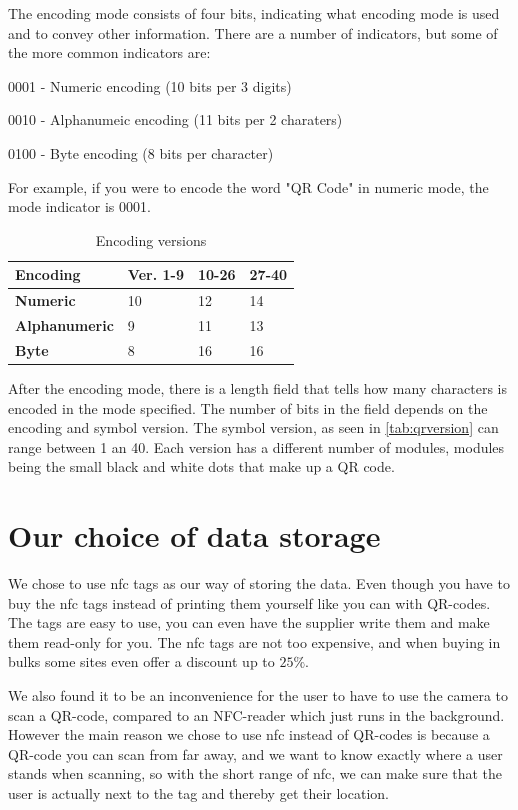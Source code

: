 The encoding mode consists of four bits, indicating what encoding mode is used and to convey other information. There are a number of indicators, but some of the more common indicators are:

\begin{description}
\item 0001 - Numeric encoding (10 bits per 3 digits)
\item 0010 - Alphanumeic encoding (11 bits per 2 charaters)
\item 0100 - Byte encoding (8 bits per character)
\end{description}

For example, if you were to encode the word "QR Code" in numeric mode, the mode indicator is 0001.

\begin{table}[H]
\centering
\begin{tabular}{|l|l|l|l|}
\hline
\textbf{Encoding} & \textbf{Ver. 1-9} & \textbf{10-26} & \textbf{27-40} \\
\hline
\textbf{Numeric } & 10 & 12 & 14  \\
\hline
\textbf{Alphanumeric} & 9 & 11 & 13 \\
\hline
\textbf{Byte} & 8 & 16 & 16 \\
\hline
\end{tabular}
\caption{Encoding versions}
\label{tab:qrversion}
\end{table}

After the encoding mode, there is a length field that tells how many characters is encoded in the mode specified. The number of bits in the field depends on the encoding and symbol version\citep{qrcode1}. The symbol version, as seen in \autoref{tab:qrversion} can range between 1 an 40. Each version has a different number of modules, modules being the small black and white dots that make up a QR code\citep{qrversion}. 

\section*{Our choice of data storage}
We chose to use \ac{nfc} tags as our way of storing the data. Even though you have to buy the \ac{nfc} tags instead of printing them yourself like you can with QR-codes. The tags are easy to use, you can even have the supplier write them and make them read-only for you. The \ac{nfc} tags are not too expensive, and when buying in bulks some sites even offer a discount up to $25\%$\citep{nfczonen}. 

We also found it to be an inconvenience for the user to have to use the camera to scan a QR-code, compared to an NFC-reader which just runs in the background. However the main reason we chose to use \ac{nfc} instead of QR-codes is because a QR-code you can scan from far away, and we want to know exactly where a user stands when scanning, so with the short range of \ac{nfc}, we can make sure that the user is actually next to the tag and thereby get their location.